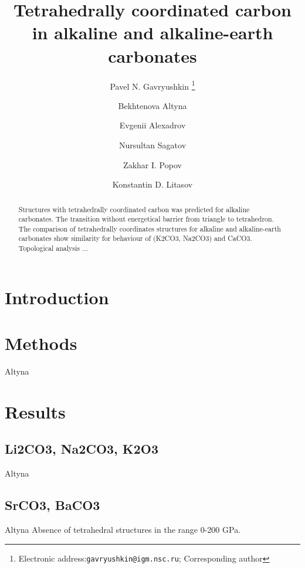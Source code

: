 \documentclass[a4paperm]{article}
\begin{document}
\title{Tetrahedrally coordinated carbon in alkaline and alkaline-earth carbonates}
\author[1,2]{Pavel N. Gavryushkin
   \thanks{Electronic address:\texttt{gavryushkin@igm.nsc.ru}; Corresponding author}}     
\author[1,2]{Bekhtenova Altyna}
\author{Evgenii Alexadrov}
\author[1,2]{Nursultan Sagatov}
\author[3]{Zakhar I. Popov}
\author[1,2]{Konstantin D. Litasov}


\maketitle

\begin{abstract}
Structures with tetrahedrally coordinated carbon was predicted for alkaline carbonates. The transition without energetical barrier from triangle to tetrahedron. The comparison of tetrahedrally coordinates structures for alkaline and alkaline-earth carbonates show similarity for behaviour of (K2CO3, Na2CO3) and CaCO3. Topological analysis ...

\end{abstract}


\section*{Introduction}
 

\section{Methods}
Altyna

\section{Results}


\subsection{Li2CO3, Na2CO3, K2O3} Altyna

\subsection{SrCO3, BaCO3} Altyna
Absence of tetrahedral structures in the range 0-200 GPa. 
\end{document}
